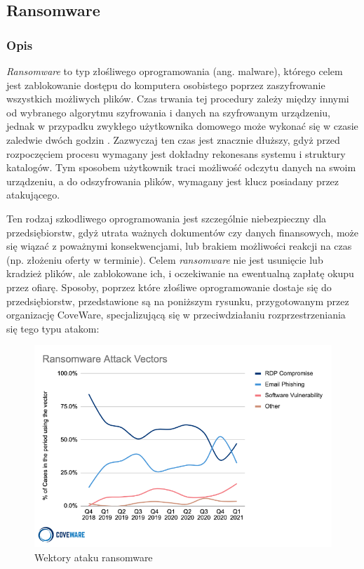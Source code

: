 \documentclass[12pt,twoside]{article}
\begin{document}
\clearpage

\subsection{Ransomware}
\subsubsection{Opis}
\emph{Ransomware} to typ złośliwego oprogramowania (ang. malware), którego celem jest zablokowanie dostępu do komputera osobistego poprzez zaszyfrowanie wszystkich możliwych plików. Czas trwania tej procedury zależy między innymi od wybranego algorytmu szyfrowania i danych na szyfrowanym urządzeniu, jednak w przypadku zwykłego użytkownika domowego może wykonać się w czasie zaledwie dwóch godzin \cite{RansomwareTime}. Zazwyczaj ten czas jest znacznie dłuższy, gdyż przed rozpoczęciem procesu wymagany jest dokładny rekonesans systemu i struktury katalogów. Tym sposobem użytkownik traci możliwość odczytu danych na swoim urządzeniu, a do odszyfrowania plików, wymagany jest klucz posiadany przez atakującego. 

Ten rodzaj szkodliwego oprogramowania jest szczególnie niebezpieczny dla przedsiębiorstw, gdyż utrata ważnych dokumentów czy danych finansowych, może się wiązać z poważnymi konsekwencjami, lub brakiem możliwości reakcji na czas (np. złożeniu oferty w terminie). Celem \emph{ransomware} nie jest usunięcie lub kradzież plików, ale zablokowane ich, i oczekiwanie na ewentualną zapłatę okupu przez ofiarę. Sposoby, poprzez które złośliwe oprogramowanie dostaje się do przedsiębiorstw, przedstawione są na poniższym rysunku, przygotowanym przez organizację CoveWare, specjalizującą się w przeciwdziałaniu rozprzestrzeniania się tego typu atakom:
\begin{figure}[H]
	\centering
	\includegraphics[width=0.77\linewidth]{figures/ransomware-attack-vectors.png}
	\caption{Wektory ataku ransomware  \cite{RansomwareAttackVectors}} 
	\label{Fig:Wektory ataku ransomware}
\end{figure} 
\end{document}
